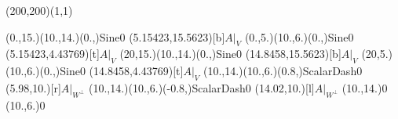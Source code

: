 \unitlength=1bp%

\begin{feynartspicture}(200,200)(1,1)

\FADiagram{}
\FAProp(0.,15.)(10.,14.)(0.,){Sine}{0}
\FALabel(5.15423,15.5623)[b]{$A|_V$}
\FAProp(0.,5.)(10.,6.)(0.,){Sine}{0}
\FALabel(5.15423,4.43769)[t]{$A|_V$}
\FAProp(20,15.)(10.,14.)(0.,){Sine}{0}
\FALabel(14.8458,15.5623)[b]{$A|_V$}
\FAProp(20,5.)(10.,6.)(0.,){Sine}{0}
\FALabel(14.8458,4.43769)[t]{$A|_V$}
\FAProp(10.,14.)(10.,6.)(0.8,){ScalarDash}{0}
\FALabel(5.98,10.)[r]{$A|_{W^\perp}$}
\FAProp(10.,14.)(10.,6.)(-0.8,){ScalarDash}{0}
\FALabel(14.02,10.)[l]{$A|_{W^\perp}$}
\FAVert(10.,14.){0}
\FAVert(10.,6.){0}
\end{feynartspicture}

